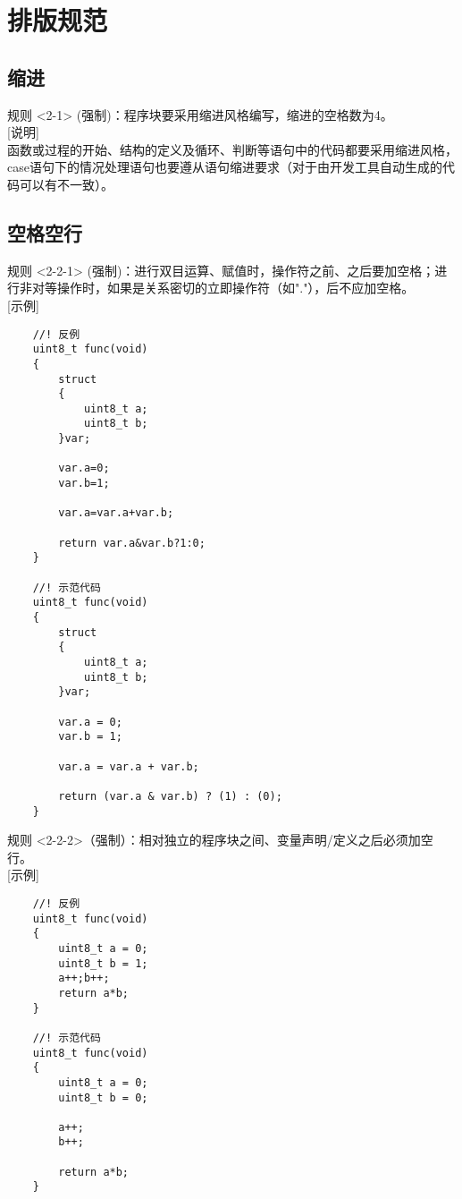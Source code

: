 \documentclass[UTF8,a4paper,12pt]{article}
\begin{document}
	\newpage
	
	\section{排版规范}
	\subsection{缩进}
	规则 <2-1> (强制)：程序块要采用缩进风格编写，缩进的空格数为4。\\
	
	[说明]\\
	函数或过程的开始、结构的定义及循环、判断等语句中的代码都要采用缩进风格，case语句下的情况处理语句也要遵从语句缩进要求（对于由开发工具自动生成的代码可以有不一致）。\\
	
	\subsection{空格空行}
	规则 <2-2-1> (强制)：进行双目运算、赋值时，操作符之前、之后要加空格；进行非对等操作时，如果是关系密切的立即操作符（如"."），后不应加空格。\\
	
	[示例]\\
	\begin{lstlisting}
	//! 反例
	uint8_t func(void)
	{
		struct
		{
			uint8_t a;
			uint8_t b;
		}var;
		
		var.a=0;
		var.b=1;
		
		var.a=var.a+var.b;
		
		return var.a&var.b?1:0;
	}
	
	//! 示范代码
	uint8_t func(void)
	{
		struct
		{
			uint8_t a;
			uint8_t b;
		}var;
		
		var.a = 0;
		var.b = 1;
		
		var.a = var.a + var.b;
		
		return (var.a & var.b) ? (1) : (0);
	}
	\end{lstlisting}
	
	规则 <2-2-2>（强制）：相对独立的程序块之间、变量声明/定义之后必须加空行。\\
	
	[示例]\\
	\begin{lstlisting}
	//! 反例
	uint8_t func(void)
	{
		uint8_t a = 0;
		uint8_t b = 1;
		a++;b++;
		return a*b;
	}
	
	//! 示范代码
	uint8_t func(void)
	{
		uint8_t a = 0;
		uint8_t b = 0;
		
		a++;
		b++;
		
		return a*b;
	}
	\end{lstlisting}
	
\end{document}
